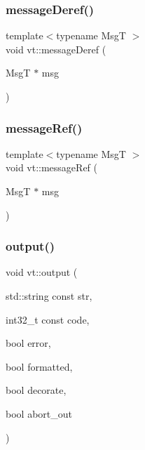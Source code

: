 \subsubsection{\texorpdfstring{message\+Deref()}{messageDeref()}}
{\footnotesize\ttfamily template$<$typename MsgT $>$ \\
void vt\+::message\+Deref (\begin{DoxyParamCaption}\item[{MsgT $\ast$}]{msg }\end{DoxyParamCaption})}

\mbox{\label{namespacevt_aa4a692a62fffd91e7e708d8047897a60}} 
\subsubsection{\texorpdfstring{message\+Ref()}{messageRef()}}
{\footnotesize\ttfamily template$<$typename MsgT $>$ \\
void vt\+::message\+Ref (\begin{DoxyParamCaption}\item[{MsgT $\ast$}]{msg }\end{DoxyParamCaption})}

\mbox{\label{namespacevt_ad3ca3e8710dd3c8badff897f8de3c858}} 
\subsubsection{\texorpdfstring{output()}{output()}}
{\footnotesize\ttfamily void vt\+::output (\begin{DoxyParamCaption}\item[{std\+::string const}]{str,  }\item[{int32\+\_\+t const}]{code,  }\item[{bool}]{error,  }\item[{bool}]{formatted,  }\item[{bool}]{decorate,  }\item[{bool}]{abort\+\_\+out }\end{DoxyParamCaption})}

\mbox{\label{namespacevt_af00ebdeb74801e5658cf5726193d5753}} 
